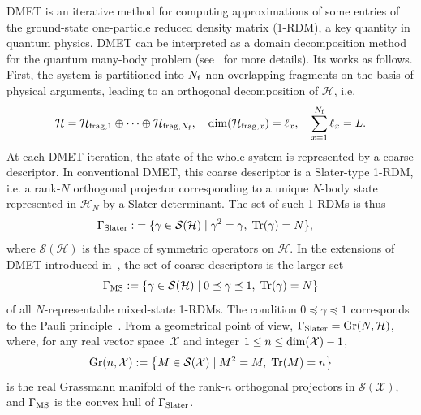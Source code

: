 \documentclass{article}
\newcommand{\tr}{{\rm Tr}}
\newcommand{\1}{{\mathds 1}}
\begin{document}
DMET is an iterative method for computing approximations of some entries of the ground-state one-particle reduced density matrix (1-RDM), a key quantity in quantum physics. DMET can be interpreted as a domain decomposition method for the quantum many-body problem (see~\cite{CFKLL2025,negre2025DMET} for more details). Its works as follows. First, the system is partitioned into $N_{\rm f}$ non-overlapping fragments on the basis of physical arguments, leading to an orthogonal decomposition of $\mathcal H$, i.e.
\begin{equation}\label{eq:fragmentation}
\mathcal H = \mathcal H_{{\rm frag},1} \oplus \cdots \oplus \mathcal H_{{\rm frag},N_{\rm f}}, \quad {\rm dim}(\mathcal H_{{\rm frag},x})=\ell_x, \quad \sum_{x=1}^{N_{\rm f}} \ell_x=L.
\end{equation}
At each DMET iteration, the state of the whole system is represented by a coarse descriptor. In conventional DMET, this coarse descriptor is a Slater-type 1-RDM, i.e. a rank-$N$ orthogonal projector corresponding to a unique $N$-body state represented in $\mathcal H_N$ by a Slater determinant. The set of such 1-RDMs is thus
\begin{align*}
{\Gamma}_{\rm Slater}:&=\{ \gamma \in {\mathcal S}(\mathcal H) \; | \; \gamma^2=\gamma, \; \tr(\gamma)=N\},
\end{align*}
where ${\mathcal S}(\mathcal H)$ is the space of symmetric operators on $\mathcal H$. In the extensions of DMET introduced in~\cite{negre2025DMET}, the set of coarse descriptors is the larger set 
$$
{\Gamma}_{\rm MS}:=\{ \gamma \in {\mathcal S}(\mathcal H) \; | \; 0 \preceq \gamma \preceq 1, \; \tr(\gamma)=N\}
$$
of all $N$-representable mixed-state 1-RDMs. The condition $ 0 \preceq \gamma \preceq 1$ corresponds to the Pauli principle~\cite{pauli1925zusammenhang}. From a geometrical point of view, ${\Gamma}_{\rm Slater}={\rm Gr}(N,\mathcal H)$, where, for any real vector space~$\mathcal X$ and integer $1 \le n \le {\rm dim}(\mathcal X)-1$,
$$
{\rm Gr}(n,\mathcal X):= \left\{ M \in \mathcal S(\mathcal X) \; | \; M^2=M, \; \tr(M)=n \right\}
$$
is the real Grassmann manifold of the rank-$n$ orthogonal projectors in $\mathcal S(\mathcal X)$, and ${\Gamma}_{\rm MS}$ is the convex hull of ${\Gamma}_{\rm Slater}$. 

\medskip
\end{document}
